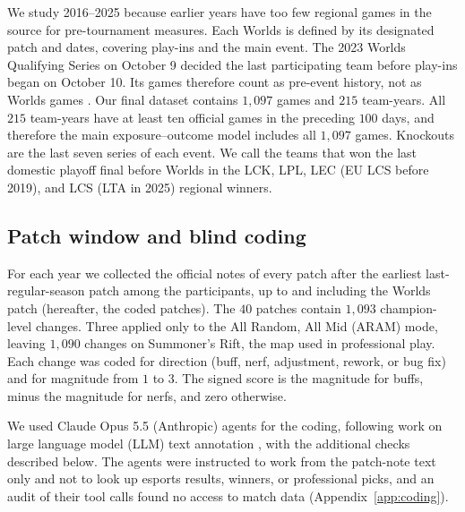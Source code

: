 \documentclass[11pt]{article}
\begin{document}
We study 2016--2025 because earlier years have too few regional games in the source for pre-tournament measures. Each Worlds is defined by its designated patch and dates, covering play-ins and the main event. The 2023 Worlds Qualifying Series on October 9 decided the last participating team before play-ins began on October 10. Its games therefore count as pre-event history, not as Worlds games \citep{riot2023wqs,riot2023dates}. Our final dataset contains $1{,}097$ games and $215$ team-years. All $215$ team-years have at least ten official games in the preceding $100$ days, and therefore the main exposure--outcome model includes all $1{,}097$ games. Knockouts are the last seven series of each event. We call the teams that won the last domestic playoff final before Worlds in the LCK, LPL, LEC (EU LCS before 2019), and LCS (LTA in 2025) regional winners.

\subsection{Patch window and blind coding}
\label{sec:coding}
For each year we collected the official notes of every patch after the earliest last-regular-season patch among the participants, up to and including the Worlds patch (hereafter, the coded patches). The $40$ patches contain $1{,}093$ champion-level changes. Three applied only to the All Random, All Mid (ARAM) mode, leaving $1{,}090$ changes on Summoner's Rift, the map used in professional play. Each change was coded for direction (buff, nerf, adjustment, rework, or bug fix) and for magnitude from $1$ to $3$. The signed score is the magnitude for buffs, minus the magnitude for nerfs, and zero otherwise.

We used Claude Opus 5.5 (Anthropic) agents for the coding, following work on large language model (LLM) text annotation \citep{gilardi2023,ziems2024}, with the additional checks described below. The agents were instructed to work from the patch-note text only and not to look up esports results, winners, or professional picks, and an audit of their tool calls found no access to match data (Appendix~\ref{app:coding}).
\end{document}
